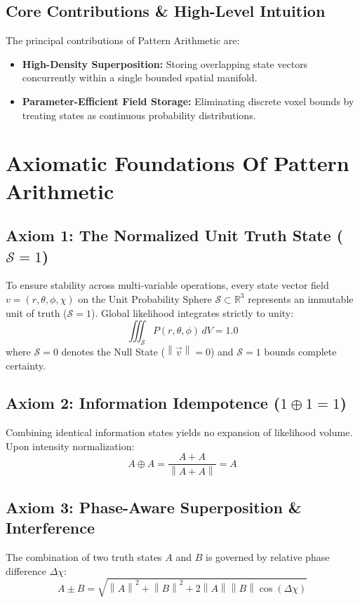 \documentclass[12pt, a4paper]{article}
\providecommand{\norm}[1]{\left\lVert#1\right\rVert}
\begin{document}
\subsection{Core Contributions \& High-Level Intuition}
The principal contributions of Pattern Arithmetic are:
\begin{itemize}
    \item \textbf{High-Density Superposition:} Storing overlapping state vectors concurrently within a single bounded spatial manifold.
    \item \textbf{Parameter-Efficient Field Storage:} Eliminating discrete voxel bounds by treating states as continuous probability distributions.
\end{itemize}

\section{Axiomatic Foundations Of Pattern Arithmetic}

\subsection{Axiom 1: The Normalized Unit Truth State ($\mathcal{S} = 1$)}
\label{subsec:axiom1}
To ensure stability across multi-variable operations, every state vector field $v = (r, \theta, \phi, \chi)$ on the Unit Probability Sphere $\mathcal{S} \subset \mathbb{R}^3$ represents an immutable unit of truth ($\mathcal{S} = 1$). Global likelihood integrates strictly to unity:
\begin{equation}
    \iiint_{\mathcal{S}} P(r, \theta, \phi) \, dV = 1.0
    \label{eq:unit_truth}
\end{equation}
where $\mathcal{S} = 0$ denotes the Null State ($\norm{\vec{v}} = 0$) and $\mathcal{S} = 1$ bounds complete certainty.

\subsection{Axiom 2: Information Idempotence ($1 \oplus 1 = 1$)}
\label{subsec:axiom2}
Combining identical information states yields no expansion of likelihood volume. Upon intensity normalization:
\begin{equation}
    A \oplus A = \frac{A + A}{\norm{A + A}} = A
    \label{eq:idempotence_formal}
\end{equation}

\subsection{Axiom 3: Phase-Aware Superposition \& Interference}
\label{subsec:axiom3}
The combination of two truth states $A$ and $B$ is governed by relative phase difference $\Delta\chi$:
\begin{equation}
    A \pm B = \sqrt{\norm{A}^2 + \norm{B}^2 + 2\norm{A}\norm{B}\cos(\Delta\chi)}
    \label{eq:interference_formal}
\end{equation}
\end{document}
